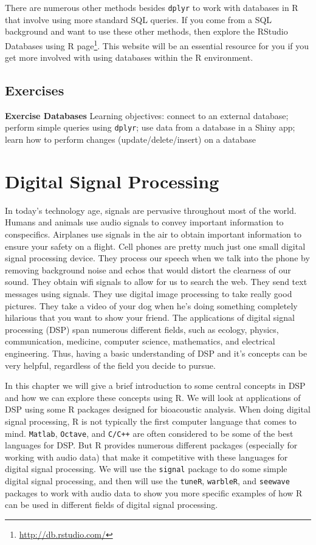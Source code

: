 \documentclass[
]{krantz}
\renewcommand{\href}[2]{#2\footnote{\url{#1}}}
\begin{document}
There are numerous other methods besides \texttt{dplyr} to work with databases in R that involve using more standard SQL queries. If you come from a SQL background and want to use these other methods, then explore the \href{http://db.rstudio.com/}{RStudio Databases using R page}. This website will be an essential resource for you if you get more involved with using databases within the R environment.

\hypertarget{exercises-10}{%
\section{Exercises}\label{exercises-10}}

\textbf{Exercise Databases} Learning objectives: connect to an external database; perform simple queries using \texttt{dplyr}; use data from a database in a Shiny app; learn how to perform changes (update/delete/insert) on a database

\hypertarget{digital-signal-processing}{%
\chapter{Digital Signal Processing}\label{digital-signal-processing}}

In today's technology age, signals are pervasive throughout most of the world. Humans and animals use audio signals to convey important information to conspecifics. Airplanes use signals in the air to obtain important information to ensure your safety on a flight. Cell phones are pretty much just one small digital signal processing device. They process our speech when we talk into the phone by removing background noise and echos that would distort the clearness of our sound. They obtain wifi signals to allow for us to search the web. They send text messages using signals. They use digital image processing to take really good pictures. They take a video of your dog when he's doing something completely hilarious that you want to show your friend. The applications of digital signal processing (DSP) span numerous different fields, such as ecology, physics, communication, medicine, computer science, mathematics, and electrical engineering. Thus, having a basic understanding of DSP and it's concepts can be very helpful, regardless of the field you decide to pursue.

In this chapter we will give a brief introduction to some central concepts in DSP and how we can explore these concepts using R. We will look at applications of DSP using some R packages designed for bioacoustic analysis. When doing digital signal processing, R is not typically the first computer language that comes to mind. \texttt{Matlab}, \texttt{Octave}, and \texttt{C/C++} are often considered to be some of the best languages for DSP. But R provides numerous different packages (especially for working with audio data) that make it competitive with these languages for digital signal processing. We will use the \texttt{signal} package to do some simple digital signal processing, and then will use the \texttt{tuneR}, \texttt{warbleR}, and \texttt{seewave} packages to work with audio data to show you more specific examples of how R can be used in different fields of digital signal processing.
\end{document}
